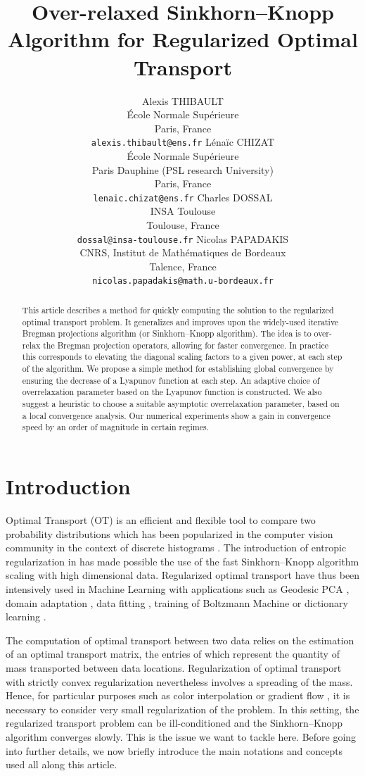 \documentclass{article} %
\title{Over-relaxed Sinkhorn--Knopp Algorithm for Regularized Optimal Transport}
\author{
Alexis THIBAULT\\
\'Ecole Normale Sup\'erieure\\
Paris, France\\
\texttt{alexis.thibault@ens.fr}
 \And
L\'ena\"ic CHIZAT\\
\'Ecole Normale Sup\'erieure\\ Paris Dauphine (PSL research University)\\
Paris, France\\
\texttt{lenaic.chizat@ens.fr}
 \AND
Charles DOSSAL\\
INSA Toulouse\\
Toulouse,  France\\
\texttt{dossal@insa-toulouse.fr}
\And 
Nicolas PAPADAKIS\\
CNRS, Institut de Math\'ematiques de Bordeaux\\
Talence, France\\
\texttt{nicolas.papadakis@math.u-bordeaux.fr}
}
\theoremstyle{plain}
\theoremstyle{definition}
\theoremstyle{remark}
\begin{document}
\maketitle

\begin{abstract}
This article describes a method for quickly computing the solution to the regularized optimal transport problem. It generalizes and improves upon the widely-used iterative Bregman projections algorithm (or Sinkhorn--Knopp algorithm). 
The idea is to over-relax the Bregman projection operators, allowing for faster convergence. In practice this corresponds to elevating the diagonal scaling factors to a given power, at each step of the algorithm.
We propose a simple method for establishing global convergence by ensuring the decrease of a Lyapunov function at each step.
An adaptive choice of overrelaxation parameter based on the Lyapunov function is constructed.
We also suggest a heuristic to choose a suitable asymptotic overrelaxation parameter, based on a local convergence analysis. Our numerical experiments show a gain in convergence speed by an order of magnitude in certain regimes.
\end{abstract}

\section{Introduction}
Optimal Transport (OT) is an efficient and flexible tool to compare two probability distributions which has been popularized in the computer vision community in the context of discrete histograms \cite{Rubner2000}. The introduction of entropic regularization in \cite{cuturi13} has made possible the use of the fast Sinkhorn--Knopp algorithm \cite{sinkhorn64}   scaling with high dimensional data. 
Regularized optimal transport have thus been intensively used  in  Machine Learning with applications such as   Geodesic PCA \cite{seguy2015principal}, domain adaptation \cite{2015arXiv150700504C}, data fitting \cite{2015arXiv150605439F},  training of Boltzmann Machine \cite{NIPS2016_6248}  or dictionary learning \cite{Rolet2016,2017arXiv170801955S}.

The computation of optimal transport between two data relies on the estimation of an optimal transport matrix, the entries of which represent the quantity of mass transported between  data locations. 
Regularization of optimal transport with strictly convex regularization \cite{cuturi13, dessein2016}  nevertheless involves a spreading of the mass. Hence, for particular purposes such as color interpolation \cite{Rabin2014} or gradient flow \cite{2016arXiv160705816C}, it is  necessary  to consider very small regularization of the problem.
In this setting,  the regularized transport problem can be ill-conditioned and the Sinkhorn--Knopp algorithm converges slowly. This is the issue  we want to tackle here.
Before going into further details, we now briefly introduce the main notations and concepts used all along this article.
\end{document}
